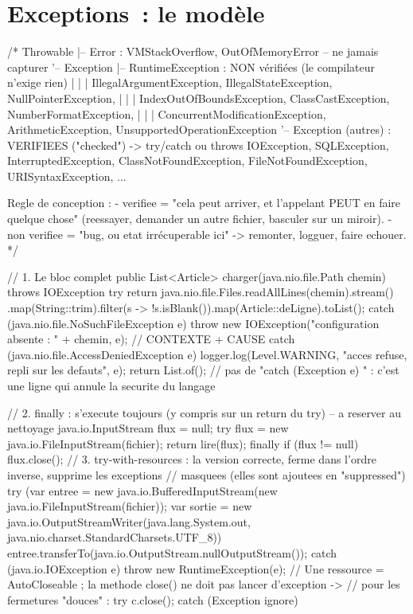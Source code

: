 \documentclass[12pt,a4paper,twoside,openright]{book}
\begin{document}
\section{Exceptions~: le mod\`ele}

\begin{codejava}
/*
  Throwable
   |-- Error                    : VMStackOverflow, OutOfMemoryError -- ne jamais capturer
   '-- Exception
        |-- RuntimeException    : NON v\'erifi\'ees (le compilateur n'exige rien)
        |   |   |     IllegalArgumentException, IllegalStateException, NullPointerException,
        |   |   |     IndexOutOfBoundsException, ClassCastException, NumberFormatException,
        |   |   |     ConcurrentModificationException, ArithmeticException, UnsupportedOperationException
        '-- Exception (autres)  : VERIFIEES ("checked") -> try/catch ou throws
              IOException, SQLException, InterruptedException,
              ClassNotFoundException, FileNotFoundException, URISyntaxException, ...

  Regle de conception :
    - verifiee   = "cela peut arriver, et l'appelant PEUT en faire quelque chose" (reessayer,
                   demander un autre fichier, basculer sur un miroir).
    - non verifiee = "bug, ou etat irr\'ecuperable ici" -> remonter, logguer, faire echouer.
*/

// 1. Le bloc complet
public List<Article> charger(java.nio.file.Path chemin) throws IOException {
    try {
        return java.nio.file.Files.readAllLines(chemin).stream()
                .map(String::trim).filter(s -> !s.isBlank()).map(Article::deLigne).toList();
    } catch (java.nio.file.NoSuchFileException e) {
        throw new IOException("configuration absente : " + chemin, e);   // CONTEXTE + CAUSE
    } catch (java.nio.file.AccessDeniedException e) {
        logger.log(Level.WARNING, "acces refuse, repli sur les defauts", e);
        return List.of();
    }
    // pas de "catch (Exception e) { }" : c'est une ligne qui annule la securite du langage
}

// 2. finally : s'execute toujours (y compris sur un return du try) -- a reserver au nettoyage
java.io.InputStream flux = null;
try {
    flux = new java.io.FileInputStream(fichier);
    return lire(flux);
} finally {
    if (flux != null) { flux.close(); }
}
// 3. try-with-resources : la version correcte, ferme dans l'ordre inverse, supprime les exceptions
//    masquees (elles sont ajoutees en "suppressed")
try (var entree = new java.io.BufferedInputStream(new java.io.FileInputStream(fichier));
     var sortie = new java.io.OutputStreamWriter(java.lang.System.out, java.nio.charset.StandardCharsets.UTF_8)) {
    entree.transferTo(java.io.OutputStream.nullOutputStream());
} catch (java.io.IOException e) {
    throw new RuntimeException(e);
}
// Une ressource = AutoCloseable ; la methode close() ne doit pas lancer d'exception ->
// pour les fermetures "douces" : try { c.close(); } catch (Exception ignore) { }


\end{codejava}
\end{document}
